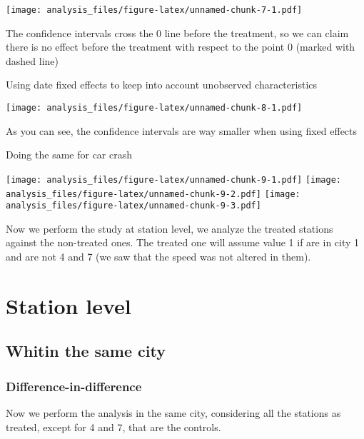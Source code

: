 \documentclass[
]{article}
\begin{document}
\texttt{[image: analysis\_files/figure-latex/unnamed-chunk-7-1.pdf]}

The confidence intervals cross the 0 line before the treatment, so we
can claim there is no effect before the treatment with respect to the
point 0 (marked with dashed line)

Using date fixed effects to keep into account unobserved characteristics

\texttt{[image: analysis\_files/figure-latex/unnamed-chunk-8-1.pdf]}

As you can see, the confidence intervals are way smaller when using
fixed effects

Doing the same for car crash

\texttt{[image: analysis\_files/figure-latex/unnamed-chunk-9-1.pdf]}
\texttt{[image: analysis\_files/figure-latex/unnamed-chunk-9-2.pdf]}
\texttt{[image: analysis\_files/figure-latex/unnamed-chunk-9-3.pdf]}

Now we perform the study at station level, we analyze the treated
stations against the non-treated ones. The treated one will assume value
1 if are in city 1 and are not 4 and 7 (we saw that the speed was not
altered in them).

\hypertarget{station-level}{%
\section{Station level}\label{station-level}}

\hypertarget{whitin-the-same-city}{%
\subsection{Whitin the same city}\label{whitin-the-same-city}}

\hypertarget{difference-in-difference}{%
\subsubsection{Difference-in-difference}\label{difference-in-difference}}

Now we perform the analysis in the same city, considering all the
stations as treated, except for 4 and 7, that are the controls.
\end{document}
